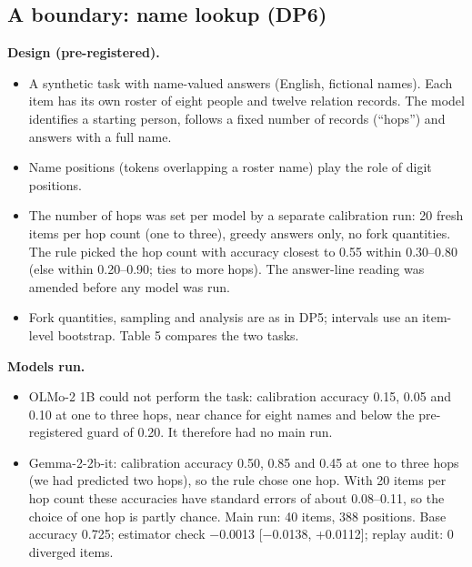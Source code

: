 \documentclass[
  10pt,
  a4paper,
]{article}
\providecommand{\tightlist}{%
  \setlength{\itemsep}{0pt}\setlength{\parskip}{0pt}}
\begin{document}
\hypertarget{a-boundary-name-lookup-dp6}{%
\subsection{A boundary: name lookup (DP6)}\label{a-boundary-name-lookup-dp6}}

\textbf{Design (pre-registered).}

\begin{itemize}
\tightlist
\item
  A synthetic task with name-valued answers (English, fictional names). Each item has its own roster of eight people and twelve relation records. The model identifies a starting person, follows a
  fixed number of records (``hops'') and answers with a full name.
\item
  Name positions (tokens overlapping a roster name) play the role of digit positions.
\item
  The number of hops was set per model by a separate calibration run: 20 fresh items per hop count (one to three), greedy answers only, no fork quantities. The rule picked the hop count with accuracy
  closest to 0.55 within 0.30--0.80 (else within 0.20--0.90; ties to more hops). The answer-line reading was amended before any model was run.
\item
  Fork quantities, sampling and analysis are as in DP5; intervals use an item-level bootstrap. Table 5 compares the two tasks.
\end{itemize}

\textbf{Models run.}

\begin{itemize}
\tightlist
\item
  OLMo-2 1B could not perform the task: calibration accuracy 0.15, 0.05 and 0.10 at one to three hops, near chance for eight names and below the pre-registered guard of 0.20. It therefore had no main
  run.
\item
  Gemma-2-2b-it: calibration accuracy 0.50, 0.85 and 0.45 at one to three hops (we had predicted two hops), so the rule chose one hop. With 20 items per hop count these accuracies have standard errors
  of about 0.08--0.11, so the choice of one hop is partly chance. Main run: 40 items, 388 positions. Base accuracy 0.725; estimator check −0.0013 {[}−0.0138, +0.0112{]}; replay audit: 0 diverged
  items.
\end{itemize}
\end{document}
